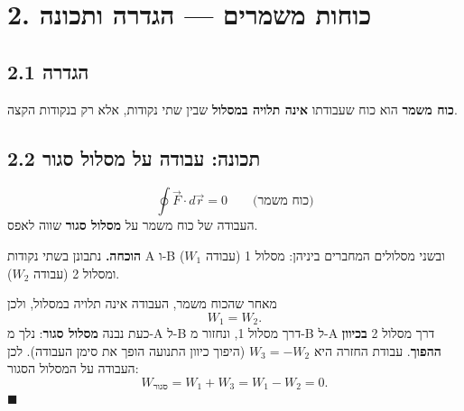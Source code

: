 \documentclass[12pt, a4paper]{article}
\newcommand{\hvec}[1]{\overrightarrow{#1}}
\begin{document}
\section*{2. כוחות משמרים --- הגדרה ותכונה}

\subsection*{2.1 הגדרה}

\begin{tcolorbox}[defbox, title={כוח משמר (\textenglish{Conservative Force})}]
\textbf{כוח משמר} הוא כוח שעבודתו \textbf{אינה תלויה במסלול} שבין שתי נקודות, אלא רק בנקודות הקצה.
\end{tcolorbox}

\subsection*{2.2 תכונה: עבודה על מסלול סגור}

\begin{tcolorbox}[resultbox, title={תכונת הכוח המשמר}]
\[
  \oint \hvec{F}\cdot d\hvec{r} = 0
  \qquad\text{(כוח משמר)}
\]
העבודה של כוח משמר על \textbf{מסלול סגור} שווה לאפס.
\end{tcolorbox}

\textbf{הוכחה.} נתבונן בשתי נקודות \textenglish{A} ו-\textenglish{B} ובשני מסלולים המחברים ביניהן: מסלול 1 (עבודה \textenglish{$W_1$}) ומסלול 2 (עבודה \textenglish{$W_2$}).

\begin{center}
\end{center}

מאחר שהכוח משמר, העבודה אינה תלויה במסלול, ולכן
\[
  W_1 = W_2 .
\]
כעת נבנה \textbf{מסלול סגור}: נלך מ-\textenglish{A} ל-\textenglish{B} דרך מסלול 1, ונחזור מ-\textenglish{B} ל-\textenglish{A} דרך מסלול 2 \textbf{בכיוון ההפוך}. עבודת החזרה היא \textenglish{$W_3 = -W_2$} (היפוך כיוון התנועה הופך את סימן העבודה). לכן העבודה על המסלול הסגור:
\[
  W_{\text{סגור}} = W_1 + W_3 = W_1 - W_2 = 0 .
\]
\hfill$\blacksquare$
\end{document}
